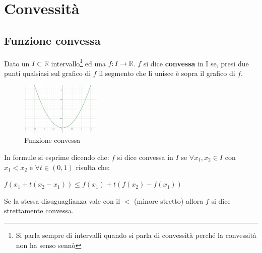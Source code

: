 \newpage
\section{Convessità}
\subsection{Funzione convessa}
\begin{definition}[Convessa]
Dato un $I \subset \mathbb{R}$ intervallo\footnote{Si parla sempre di intervalli quando si parla di convessità perché la convessità non ha senso sennò} ed una $f: I \to \mathbb{R}$. $f$ si dice \textbf{convessa} in I se, presi due punti qualsiasi sul grafico di $f$ il segmento che li unisce è sopra il grafico di $f$.
\end{definition}
\begin{figure}
    \vspace{-10pt}
    \centering
    \includegraphics[width=3.8cm]{images/convessa.png}
    \caption{Funzione convessa}
\end{figure}
\hspace{-15pt}In formule si esprime dicendo che: $f$ si dice convessa in $I$ se $\forall x_1, x_2 \in I$ con $x_1 < x_2$ e $\forall t \in (0,1)$ risulta che:
\begin{center}
    $f(x_1 + t(x_2 - x_1)) \leq f(x_1) + t(f(x_2) - f(x_1))$
\end{center}
Se la stessa disuguaglianza vale con il $<$ (minore stretto) allora $f$ si dice strettamente convessa.


